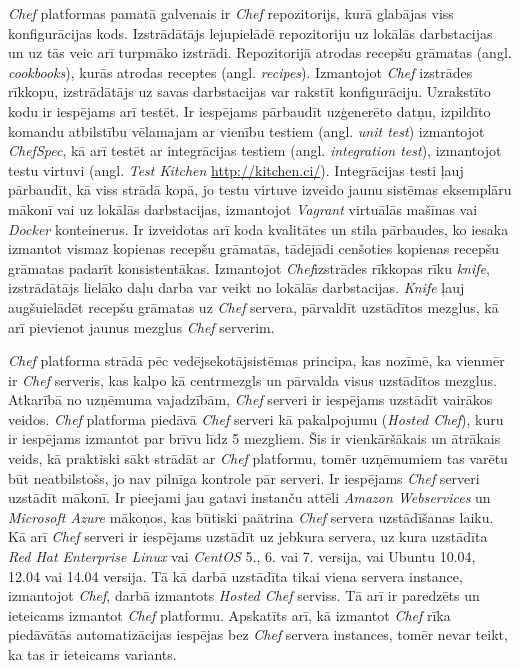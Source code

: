 \textit{Chef} platformas pamatā galvenais ir \textit{Chef} repozitorijs, kurā glabājas viss konfigurācijas kods. Izstrādātājs lejupielādē repozitoriju uz lokālās darbstacijas un uz tās veic arī turpmāko izstrādi. Repozitorijā atrodas recepšu grāmatas (angl. \textit{cookbooks}), kurās atrodas receptes (angl. \textit{recipes}).
Izmantojot \textit{Chef} izstrādes rīkkopu, izstrādātājs uz savas darbstacijas var rakstīt konfigurāciju.
Uzrakstīto kodu ir iespējams arī testēt. Ir iespējams pārbaudīt uzģenerēto datņu, izpildīto komandu atbilstību vēlamajam ar vienību testiem (angl. \textit{unit test}) izmantojot \textit{ChefSpec}, kā arī testēt ar integrācijas testiem (angl. \textit{integration test}), izmantojot testu virtuvi (angl. \textit{Test Kitchen} \url{http://kitchen.ci/}). Integrācijas testi ļauj pārbaudīt, kā viss strādā kopā, jo testu virtuve izveido jaunu sistēmas eksemplāru mākonī vai uz lokālās darbstacijas, izmantojot \textit{Vagrant} virtuālās mašīnas vai \textit{Docker} konteinerus. Ir izveidotas arī koda kvalitātes un stila pārbaudes, ko iesaka izmantot vismaz kopienas recepšu grāmatās, tādējādi cenšoties kopienas recepšu grāmatas padarīt konsistentākas.
Izmantojot \textit{Chef}izstrādes rīkkopas rīku \textit{knife}, izstrādātājs lielāko daļu darba var veikt no lokālās darbstacijas. \textit{Knife} ļauj augšuielādēt recepšu grāmatas uz \textit{Chef} servera, pārvaldīt uzstādītos mezglus, kā arī pievienot jaunus mezglus \textit{Chef} serverim.

\textit{Chef} platforma strādā pēc vedējsekotājsistēmas principa, kas nozīmē, ka vienmēr ir \textit{Chef} serveris, kas kalpo kā centrmezgls un pārvalda visus uzstādītos mezglus. Atkarībā no uzņēmuma vajadzībām, \textit{Chef} serveri ir iespējams uzstādīt vairākos veidos. \textit{Chef} platforma piedāvā \textit{Chef} serveri kā pakalpojumu (\textit{Hosted Chef}), kuru ir iespējams izmantot par brīvu līdz 5 mezgliem. Šis ir vienkāršākais un ātrākais veids, kā praktiski sākt strādāt ar \textit{Chef} platformu, tomēr uzņēmumiem tas varētu būt neatbilstošs, jo nav pilnīga kontrole pār serveri. Ir iespējams \textit{Chef} serveri uzstādīt mākonī. Ir pieejami jau gatavi instanču attēli \textit{Amazon Webservices} un \textit{Microsoft Azure} mākoņos, kas būtiski paātrina \textit{Chef} servera uzstādīšanas laiku. Kā arī \textit{Chef} serveri ir iespējams uzstādīt uz jebkura servera, uz kura uzstādīta \textit{Red Hat Enterprise Linux} vai \textit{CentOS} 5., 6. vai 7. versija, vai Ubuntu 10.04, 12.04 vai 14.04 versija.
Tā kā darbā uzstādīta tikai viena servera instance, izmantojot \textit{Chef}, darbā izmantots \textit{Hosted Chef} serviss. Tā arī ir paredzēts un ieteicams izmantot \textit{Chef} platformu. Apskatīts arī, kā izmantot \textit{Chef} rīka piedāvātās automatizācijas iespējas bez \textit{Chef} servera instances, tomēr nevar teikt, ka tas ir ieteicams variants.

